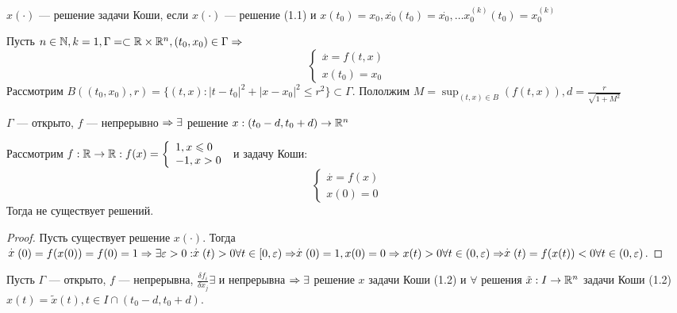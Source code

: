 \begin{note}
    \(x(\cdot)\) --- решение задачи Коши, если \(x(\cdot)\) --- решение (1.1) и \(x(t_0) = x_0,  \stackrel{.}{x_0}(t_0) = \stackrel{.}{x_0}, \dots x_0^{(k)}(t_0) = x_0^{(k)}\)
\end{note}

\begin{theorem}
    Пусть \(n \in \mathbb{N}, k = 1, \Gamma = \subset \mathbb{R} \times \mathbb{R}^n, (t_0, x_0) \in \Gamma \Rightarrow \)
    \begin{equation}
        \begin{cases}
            \stackrel{.}{x} = f(t, x) \\
            x(t_0) = x_0    
        \end{cases}
    \end{equation}
    Рассмотрим \(B((t_0, x_0), r) = \{(t, x) : |t - t_0|^2 + |x - x_0|^2 \le r^2\} \subset \Gamma\). Пололжим \(M = \sup_{(t, x) \in B}(f(t, x)), d = \frac{r}{\sqrt{1 + M^2}}\)

    \(\Gamma\) --- открыто, \(f\) --- непрерывно \(\Rightarrow \exists \) решение \(x: (t_0 - d, t_0 + d) \rightarrow \mathbb{R}^n\)
\end{theorem}

\begin{example}
    Рассмотрим \(f: \mathbb{R} \rightarrow \mathbb{R}: f(x) = \left\{\begin{array}{l}
        1, x \leqslant 0 \\
        -1, x > 0
    \end{array}\right.\) и задачу Коши:
    \[\left\{\begin{array}{l}
        \stackrel{.}{x} = f(x) \\
        x(0) = 0
    \end{array}\right.\]
    Тогда не существует решений.
\end{example}
\begin{proof}
    Пусть существует решение \(x(\cdot)\). Тогда \(\stackrel{.}{x}(0) = f(x(0)) = f(0) = 1 \Rightarrow \exists \varepsilon > 0: \stackrel{.}{x}(t) > 0 \forall t \in [0, \varepsilon) \Rightarrow \stackrel{.}{x}(0) = 1, x(0) = 0 \Rightarrow x(t) > 0 \forall t \in (0, \varepsilon) \Rightarrow \stackrel{.}{x}(t) = f(x(t)) < 0 \forall t \in (0, \varepsilon)\).
\end{proof}

\begin{theorem}
    Пусть \(\Gamma\) --- открыто, \(f\) --- непрерывна, \(\frac{\delta f_i}{\delta x_j} \exists\) и непрерывна \(\Rightarrow \exists \) решение \(x\) задачи Коши (1.2) и \(\forall\) решения \(\tilde{x}: I \rightarrow \mathbb{R}^n\) задачи Коши (1.2) \(x(t) = \tilde{x}(t), t \in I \cap (t_0 - d, t_0 + d)\).
\end{theorem}

